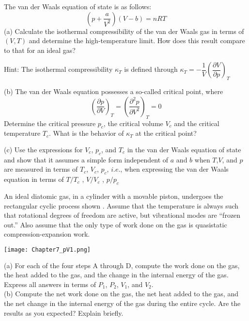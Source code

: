     \begin{example}
        The van der Waals equation of state is as follows:
        \begin{equation*}
            (p+\frac{a}{V^{2}})(V-b)=nRT
        \end{equation*}
        (a) Calculate the isothermal compressibility of the van der Waals gas in terms of $(V,T)$ and
        determine the high-temperature limit. How does this result compare to that for an ideal gas?
        
        Hint: The isothermal compressibility $\kappa_T$ is defined through $\kappa_{T}=-\dfrac{1}{V}\left(\dfrac{\partial V}{\partial p}\right)_{T}$

        (b) The van der Waals equation possesses a so-called critical point, where
        \begin{equation*}
            \left(\frac{\partial p}{\partial V}\right)_{T} = \left(\frac{\partial^{2} p}{\partial V^{2}}\right)_{T} = 0
        \end{equation*}
        Determine the critical pressure $p_c$, the critical volume $V_c$ and the critical temperature $T_c$. What
        is the behavior of $\kappa_T$ at the critical point?

        (c) Use the expressions for $V_c$, $p_c$, and $T_c$ in the van der Waals equation of state and show that it
        assumes a simple form independent of $a$ and $b$ when $T$,$V$, and $p$ are measured in terms of $T_c$,
        $V_c$, $p_c$, $i.e.$, when expressing the van der Waals equation in terms of $T/T_c$ , $V/V_c$ , $p/p_c$
    \end{example}
    \begin{example}
        An ideal diatomic gas, in a cylinder with a movable piston, undergoes the rectangular cyclic process shown
        . Assume that the temperature is always such
        that rotational degrees of freedom are active, but vibrational modes are “frozen out.” Also assume that the only
        type of work done on the gas is quasistatic compression-expansion work. 
        \begin{center}
            \texttt{[image: Chapter7\_pV1.png]}
        \end{center}
        (a) For each of the four steps A through D, compute the work done on the gas, the heat added to
        the gas, and the change in the internal energy of the gas.
        Express all answers in terms of $P_1$, $P_2$, $V_1$, and $V_2$. \\
        (b) Compute the net work done on the gas, the net
        heat added to the gas, and the net change in the internal
        energy of the gas during the entire cycle. Are the results
        as you expected? Explain briefly.
    \end{example}
